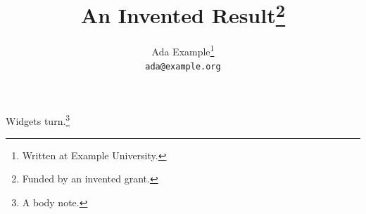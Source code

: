\documentclass{article}
\title{An Invented Result\thanks{Funded by an invented grant.}}
\author{Ada Example\thanks{Written at Example University.} \\ \texttt{ada@example.org}}
\begin{document}
\maketitle
Widgets turn.\footnote{A body note.}
\end{document}
